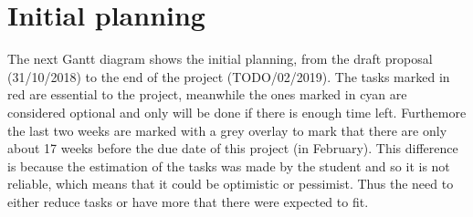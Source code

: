 \section{Initial planning}








\newcommand{\Duno}{0}
\newcommand{\Ddos}{7}
\newcommand{\Dtres}{28}
\newcommand{\Dcuatro}{7}
\newcommand{\Dcinco}{21}
\newcommand{\Dseis}{7}
\newcommand{\Dsiete}{21}
\newcommand{\Docho}{14}
\newcommand{\Dnueve}{14}
\newcommand{\Ddiez}{14}

\newcommand{\Funo}{\the\numexpr \Duno /7 \relax}
\newcommand{\Fdos}{\the\numexpr \Funo + \Ddos/7 \relax}
\newcommand{\Ftres}{\the\numexpr \Fdos + \Dtres/7 \relax}
\newcommand{\Fcuatro}{\the\numexpr \Ftres + \Dcuatro/7 \relax}
\newcommand{\Fcinco}{\the\numexpr \Fcuatro + \Dcinco/7 \relax}
\newcommand{\Fseis}{\the\numexpr \Fcinco + \Dseis/7 \relax}
\newcommand{\Fsiete}{\the\numexpr \Fseis + \Dsiete/7 \relax}
\newcommand{\Focho}{\the\numexpr \Fsiete + \Docho/7 \relax}
\newcommand{\Fnueve}{\the\numexpr \Focho + \Dnueve/7 \relax}
\newcommand{\Fdiez}{\the\numexpr \Fnueve + \Ddiez/7 \relax}

\newcommand{\Frequirement}{2}

\newcommand{\Plen}{19} %

\newcommand{\Cimportant}{red!70}
\newcommand{\Coptional}{cyan!30}


The next Gantt diagram shows the initial planning, from the draft proposal (31/10/2018) to the end of the project (TODO/02/2019).
\linej
The tasks marked in \colorbox{\Cimportant}{red} are essential to the project, meanwhile the ones marked in \colorbox{\Coptional}{cyan} are considered optional and only will be done if there is enough time left.
\linej
Furthemore the last two weeks are marked with a grey overlay to mark that there are only about 17 weeks before the due date of this project (in February). This difference is because the estimation of the tasks was made by the student and so it is not reliable, which means that it could be optimistic or pessimist. Thus the need to either reduce tasks or have more that there were expected to fit.


